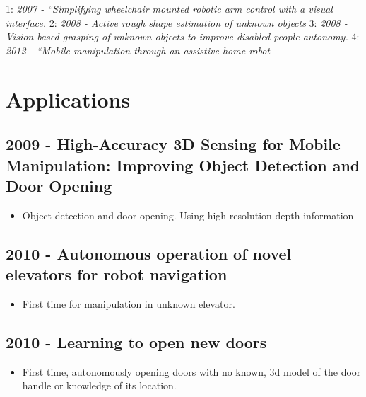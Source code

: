 1: \textit{2007 - “Simplifying wheelchair mounted robotic
arm control with a visual interface.}
2: \textit{2008 - Active rough shape estimation of unknown objects}
3: \textit{2008 - Vision-based grasping of unknown objects to improve disabled people autonomy.}
4: \textit{2012 - “Mobile manipulation through an assistive home robot}



\section{Applications}
\subsection{2009 - High-Accuracy 3D Sensing for Mobile Manipulation: Improving Object Detection and Door Opening}
\begin{itemize}
\item Object detection and door opening. Using high resolution depth information
\end{itemize}

\subsection{2010 - Autonomous operation of novel elevators for robot navigation}
\begin{itemize}
\item First time for manipulation in unknown elevator.
\end{itemize}

\subsection{2010 - Learning to open new doors}
\begin{itemize}
\item First time, autonomously opening doors with no known, 3d model of the door handle or knowledge of its location.
\end{itemize}
